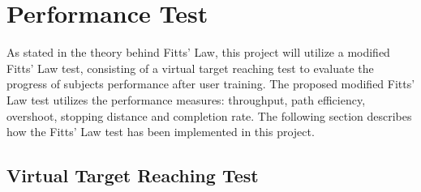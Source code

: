 \section{Performance Test} \label{sec:M:fittsLaw}



As stated in  the theory behind Fitts' Law, this project will utilize a modified Fitts' Law test, consisting of a virtual target reaching test to evaluate the progress of subjects performance after user training. The proposed modified Fitts' Law test utilizes the performance measures: throughput, path efficiency, overshoot, stopping distance and completion rate. The following section describes how the Fitts' Law test has been implemented in this project.

\subsection{Virtual Target Reaching Test} \label{sub:M:targetReachingTest}


